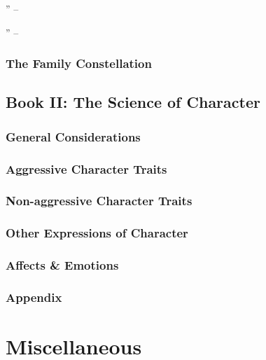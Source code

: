 \documentclass{article}
\begin{document}
'' -- \cite[pp. 129--107]{Adler_human_nature}

'' -- \cite[pp. 97--107]{Adler_human_nature}

\subsubsection{The Family Constellation}

\subsection{Book II: The Science of Character}

\subsubsection{General Considerations}

\subsubsection{Aggressive Character Traits}

\subsubsection{Non-aggressive Character Traits}

\subsubsection{Other Expressions of Character}

\subsubsection{Affects \& Emotions}

\subsubsection{Appendix}


\section{Miscellaneous}


\printbibliography[heading=bibintoc]
	
\end{document}
